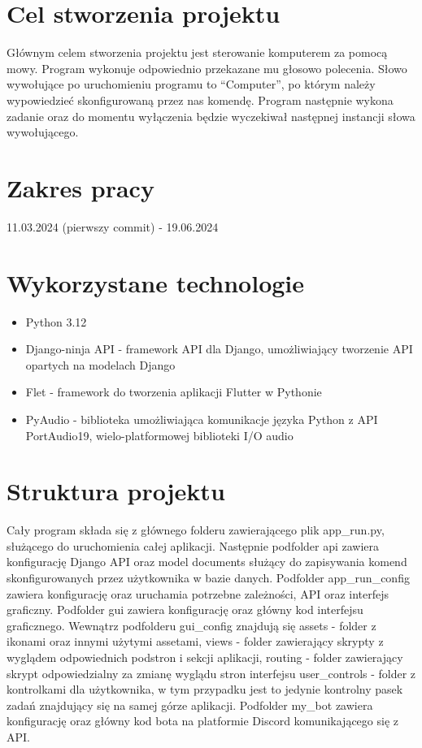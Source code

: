 \documentclass[polish]{article}
\begin{document}
    \section{Cel stworzenia projektu}

        Głównym celem stworzenia projektu jest sterowanie komputerem za pomocą mowy. Program wykonuje odpowiednio przekazane mu głosowo polecenia. Słowo wywołujące po uruchomieniu programu to ``Computer'', po którym należy wypowiedzieć skonfigurowaną przez nas komendę. Program następnie wykona zadanie oraz do momentu wyłączenia będzie wyczekiwał następnej instancji słowa wywołującego.


    \section{Zakres pracy}
        11.03.2024 (pierwszy commit) - 19.06.2024


    \section{Wykorzystane technologie}

        \begin{itemize}

            \item Python 3.12
            \item Django-ninja API - framework API dla Django, umożliwiający tworzenie API opartych na modelach Django
            \item Flet - framework do tworzenia aplikacji Flutter w Pythonie
            \item PyAudio - biblioteka umożliwiająca komunikacje języka Python z API PortAudio19, wielo-platformowej biblioteki I/O audio

        \end{itemize}


    \section{Struktura projektu}

        Cały program składa się z głównego folderu zawierającego plik app\_run.py, służącego do uruchomienia całej aplikacji.
        Następnie podfolder api zawiera konfigurację Django API oraz model documents służący do zapisywania komend skonfigurowanych przez użytkownika w bazie danych.
        Podfolder app\_run\_config zawiera konfigurację oraz uruchamia potrzebne zależności, API oraz interfejs graficzny.
        Podfolder gui zawiera konfigurację oraz główny kod interfejsu graficznego. Wewnątrz podfolderu gui\_config znajdują się assets - folder z ikonami oraz innymi użytymi assetami, views - folder zawierający skrypty z wyglądem odpowiednich podstron i sekcji aplikacji, routing - folder zawierający skrypt odpowiedzialny za zmianę wyglądu stron interfejsu
        user\_controls - folder z kontrolkami dla użytkownika, w tym przypadku jest to jedynie kontrolny pasek zadań znajdujący się na samej górze aplikacji.
        Podfolder my\_bot zawiera konfigurację oraz główny kod bota na platformie Discord komunikającego się z API.
\end{document}
